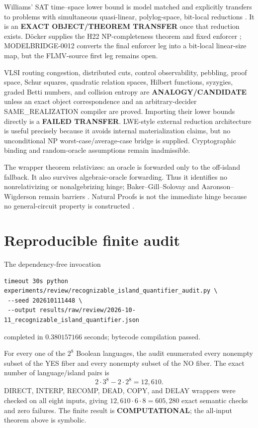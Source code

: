 \documentclass[11pt]{article}
\newcommand{\COMP}{\textbf{COMPUTATIONAL}}
\begin{document}
Williams' SAT time--space lower bound is model matched and explicitly
transfers to problems with simultaneous quasi-linear, polylog-space,
bit-local reductions \cite{williams}.  It is an
\textbf{EXACT OBJECT/THEOREM TRANSFER} once that reduction exists.  D\"ocker
supplies the H22 NP-completeness theorem and fixed enforcer
\cite{doecker}; MODELBRIDGE-0012 converts the final enforcer leg into a
bit-local linear-size map, but the FLMV-source first leg remains open.

VLSI routing congestion, distributed cuts, control observability, pebbling,
proof space, Schur squares, quadratic relation spaces, Hilbert functions,
syzygies, graded Betti numbers, and collision entropy are
\textbf{ANALOGY/CANDIDATE} unless an exact object correspondence and an
arbitrary-decider SAME\_REALIZATION compiler are proved.  Importing their
lower bounds directly is a \textbf{FAILED TRANSFER}.  LWE-style external
reduction architecture is useful precisely because it avoids internal
materialization claims, but no unconditional NP worst-case/average-case
bridge is supplied.  Cryptographic binding and random-oracle assumptions
remain inadmissible.

The wrapper theorem relativizes: an oracle is forwarded only to the
off-island fallback.  It also survives algebraic-oracle forwarding.  Thus it
identifies no nonrelativizing or nonalgebrizing hinge; Baker--Gill--Solovay
and Aaronson--Wigderson remain barriers \cite{bgs,aw}.  Natural Proofs is not
the immediate hinge because no general-circuit property is constructed
\cite{rr}.

\section{Reproducible finite audit}

The dependency-free invocation
\begin{verbatim}
timeout 30s python experiments/review/recognizable_island_quantifier_audit.py \
 --seed 202610111448 \
 --output results/raw/review/2026-10-11_recognizable_island_quantifier.json
\end{verbatim}
completed in $0.380157166$ seconds; bytecode compilation passed.

For every one of the $2^8$ Boolean languages, the audit enumerated every
nonempty subset of the YES fiber and every nonempty subset of the NO fiber.
The exact number of language/island pairs is
\[
 2\cdot3^8-2\cdot2^8=12{,}610.
\]
DIRECT, INTERP, RECOMP, DEAD, COPY, and DELAY wrappers were checked on all
eight inputs, giving $12{,}610\cdot6\cdot8=605{,}280$ exact semantic checks
and zero failures.  The finite result is \COMP; the all-input theorem above
is symbolic.
\end{document}

